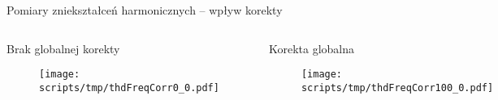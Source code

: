 \begin{frame}{Pomiary zniekształceń harmonicznych -- wpływ korekty}

    \begin{columns}

        \begin{block}{Brak globalnej korekty}
            \begin{figure}[H]
                \centering
                \texttt{[image: scripts/tmp/thdFreqCorr0\_0.pdf]} 
            \end{figure}   
        \end{block}


        \begin{block}{Korekta globalna}
            \begin{figure}[H]
                \centering
                \texttt{[image: scripts/tmp/thdFreqCorr100\_0.pdf]}
            \end{figure}   
        \end{block}
    \end{columns}

\end{frame}

